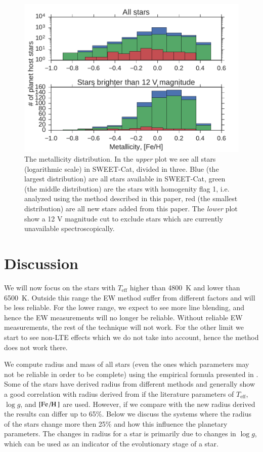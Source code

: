 \documentclass{aa}
\begin{document}
\begin{figure}[tpb]
    \centering
    \includegraphics[width=1.0\linewidth]{figures/metallicityDistribution.pdf}
    \caption{The metallicity distribution. In the \emph{upper} plot we see all
             stars (logarithmic scale) in SWEET-Cat, divided in three. Blue
             (the largest distribution) are all stars available in SWEET-Cat,
             green (the middle distribution) are the stars with homogenity flag
             1, i.e. analyzed using the method described in this paper, red
             (the smallest distribution) are all new stars added from this
             paper. The \emph{lower} plot show a 12 V magnitude cut to exclude
             stars which are currently unavailable spectroscopically.}
    \label{fig:distribution}
\end{figure}



\section{Discussion}
\label{sec:Discussion}
We will now focus on the stars with $T_\mathrm{eff}$ higher than \SI{4800}{K}
and lower than \SI{6500}{K}. Outside this range the EW method suffer from
different factors and will be less reliable. For the lower range, we expect to
see more line blending, and hence the EW measurements will no longer be
reliable. Without reliable EW measurements, the rest of the technique will not
work. For the other limit we start to see non-LTE effects which we do not take
into account, hence the method does not work there.

We compute radius and mass of all stars (even the ones which parameters may not
be reliable in order to be complete) using the empirical formula presented in
\citet{Torres2010}. Some of the stars have derived radius from different methods
and generally show a good correlation with radius derived from
\citet{Torres2010} if the literature parameters of $T_\mathrm{eff}$, $\log g$,
and $[\ion{Fe}/\ion{H}]$ are used. However, if we compare with the new radius
derived the results can differ up to 65\%. Below we discuss the systems where
the radius of the stars change more then 25\% and how this influence the
planetary parameters. The changes in radius for a star is primarily due to
changes in $\log g$, which can be used as an indicator of the evolutionary stage
of a star.
\end{document}
